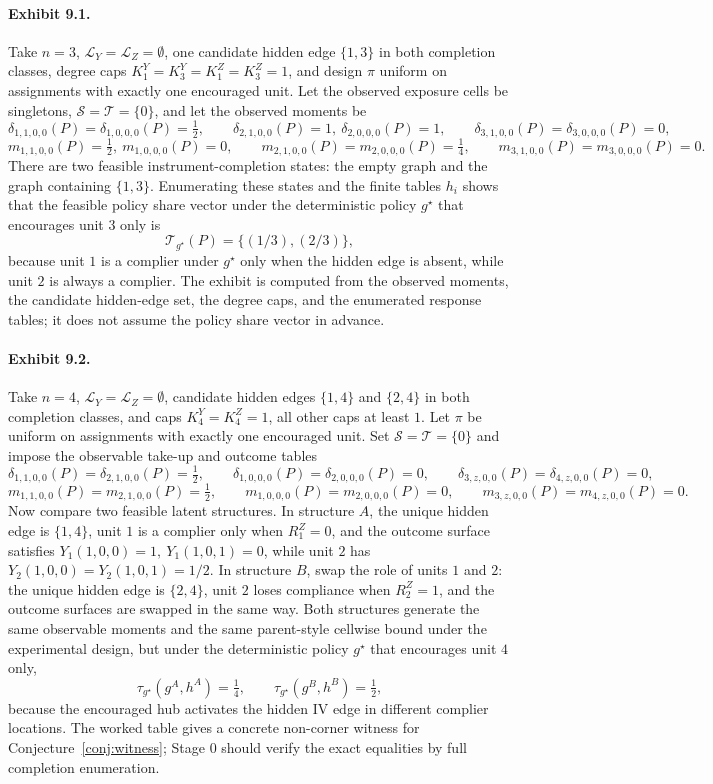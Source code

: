 \documentclass[11pt]{article}
\theoremstyle{definition}
\theoremstyle{plain}
\theoremstyle{remark}
\begin{document}
\paragraph{Exhibit 9.1.}
Take \(n=3\), \(\mathcal L_Y=\mathcal L_Z=\emptyset\), one candidate hidden edge \(\{1,3\}\) in both completion classes, degree caps \(K_1^Y=K_3^Y=K_1^Z=K_3^Z=1\), and design \(\pi\) uniform on assignments with exactly one encouraged unit. Let the observed exposure cells be singletons, \(\mathcal S=\mathcal T=\{0\}\), and let the observed moments be
\[
\delta_{1,1,0,0}(P)=\delta_{1,0,0,0}(P)=\tfrac12,\qquad
\delta_{2,1,0,0}(P)=1,\ \delta_{2,0,0,0}(P)=1,\qquad
\delta_{3,1,0,0}(P)=\delta_{3,0,0,0}(P)=0,
\]
\[
m_{1,1,0,0}(P)=\tfrac12,\ m_{1,0,0,0}(P)=0,\qquad
m_{2,1,0,0}(P)=m_{2,0,0,0}(P)=\tfrac14,\qquad
m_{3,1,0,0}(P)=m_{3,0,0,0}(P)=0.
\]
There are two feasible instrument-completion states: the empty graph and the graph containing \(\{1,3\}\). Enumerating these states and the finite tables \(h_i\) shows that the feasible policy share vector under the deterministic policy \(g^\star\) that encourages unit \(3\) only is
\[
\mathcal T_{g^\star}(P)=\{(1/3),(2/3)\},
\]
because unit \(1\) is a complier under \(g^\star\) only when the hidden edge is absent, while unit \(2\) is always a complier. The exhibit is computed from the observed moments, the candidate hidden-edge set, the degree caps, and the enumerated response tables; it does not assume the policy share vector in advance.

\paragraph{Exhibit 9.2.}
Take \(n=4\), \(\mathcal L_Y=\mathcal L_Z=\emptyset\), candidate hidden edges \(\{1,4\}\) and \(\{2,4\}\) in both completion classes, and caps \(K_4^Y=K_4^Z=1\), all other caps at least \(1\). Let \(\pi\) be uniform on assignments with exactly one encouraged unit. Set \(\mathcal S=\mathcal T=\{0\}\) and impose the observable take-up and outcome tables
\[
\delta_{1,1,0,0}(P)=\delta_{2,1,0,0}(P)=\tfrac12,\qquad
\delta_{1,0,0,0}(P)=\delta_{2,0,0,0}(P)=0,\qquad
\delta_{3,z,0,0}(P)=\delta_{4,z,0,0}(P)=0,
\]
\[
m_{1,1,0,0}(P)=m_{2,1,0,0}(P)=\tfrac12,\qquad
m_{1,0,0,0}(P)=m_{2,0,0,0}(P)=0,\qquad
m_{3,z,0,0}(P)=m_{4,z,0,0}(P)=0.
\]
Now compare two feasible latent structures. In structure \(A\), the unique hidden edge is \(\{1,4\}\), unit \(1\) is a complier only when \(R_1^Z=0\), and the outcome surface satisfies \(Y_1(1,0,0)=1,\ Y_1(1,0,1)=0\), while unit \(2\) has \(Y_2(1,0,0)=Y_2(1,0,1)=1/2\). In structure \(B\), swap the role of units \(1\) and \(2\): the unique hidden edge is \(\{2,4\}\), unit \(2\) loses compliance when \(R_2^Z=1\), and the outcome surfaces are swapped in the same way. Both structures generate the same observable moments and the same parent-style cellwise bound under the experimental design, but under the deterministic policy \(g^\star\) that encourages unit \(4\) only,
\[
\tau_{g^\star}(g^{A},h^{A})=\tfrac14,\qquad
\tau_{g^\star}(g^{B},h^{B})=\tfrac12,
\]
because the encouraged hub activates the hidden IV edge in different complier locations. The worked table gives a concrete non-corner witness for Conjecture~\ref{conj:witness}; Stage 0 should verify the exact equalities by full completion enumeration.
\end{document}
